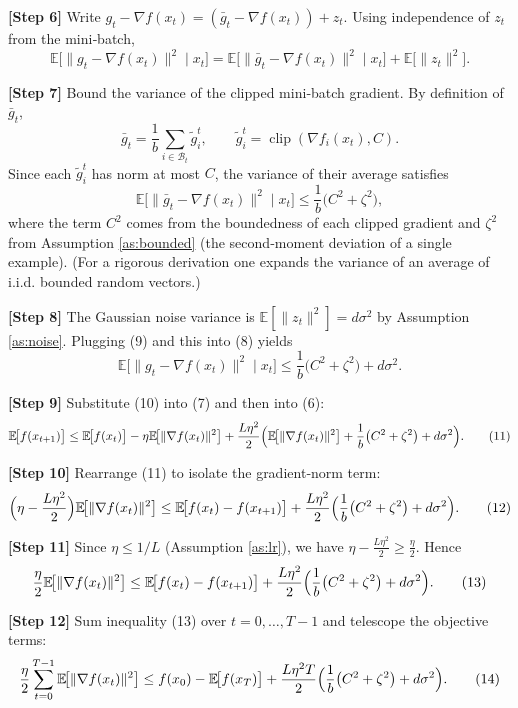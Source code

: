 \documentclass[11pt]{article}
\newcommand{\E}{\mathbb{E}}
\newcommand{\grad}{\nabla}
\begin{document}
\noindent\textbf{[Step 6]} Write $g_{t}-\grad f(x_{t})=(\bar g_{t}-\grad f(x_{t}))+z_{t}$. Using independence of $z_{t}$ from the mini‑batch,
\[
\E\!\bigl[\|g_{t}-\grad f(x_{t})\|^{2}\mid x_{t}\bigr]
= \E\!\bigl[\|\bar g_{t}-\grad f(x_{t})\|^{2}\mid x_{t}\bigr]
+ \E\!\bigl[\|z_{t}\|^{2}\bigr].
\tag{8}
\]

\noindent\textbf{[Step 7]} Bound the variance of the clipped mini‑batch gradient. By definition of $\bar g_{t}$,
\[
\bar g_{t}= \frac{1}{b}\sum_{i\in\mathcal{B}_{t}}\tilde g_{i}^{t},
\qquad
\tilde g_{i}^{t}= \operatorname{clip}(\grad f_{i}(x_{t}),C).
\]
Since each $\tilde g_{i}^{t}$ has norm at most $C$, the variance of their average satisfies
\[
\E\!\bigl[\|\bar g_{t}-\grad f(x_{t})\|^{2}\mid x_{t}\bigr]
\le \frac{1}{b}\bigl(C^{2}+\zeta^{2}\bigr),
\tag{9}
\]
where the term $C^{2}$ comes from the boundedness of each clipped gradient and $\zeta^{2}$ from Assumption \ref{as:bounded} (the second‑moment deviation of a single example).  
(For a rigorous derivation one expands the variance of an average of i.i.d. bounded random vectors.)

\noindent\textbf{[Step 8]} The Gaussian noise variance is $\E[\|z_{t}\|^{2}]=d\sigma^{2}$ by Assumption \ref{as:noise}. Plugging (9) and this into (8) yields
\[
\E\!\bigl[\|g_{t}-\grad f(x_{t})\|^{2}\mid x_{t}\bigr]
\le \frac{1}{b}\bigl(C^{2}+\zeta^{2}\bigr)+d\sigma^{2}.
\tag{10}
\]

\noindent\textbf{[Step 9]} Substitute (10) into (7) and then into (6):
\[
\E\!\bigl[f(x_{t+1})\bigr]
\le \E\!\bigl[f(x_{t})\bigr]
-\eta\E\!\bigl[\|\grad f(x_{t})\|^{2}\bigr]
+\frac{L\eta^{2}}{2}\Bigl(\E\!\bigl[\|\grad f(x_{t})\|^{2}\bigr]
+\frac{1}{b}\bigl(C^{2}+\zeta^{2}\bigr)+d\sigma^{2}\Bigr).
\tag{11}
\]

\noindent\textbf{[Step 10]} Rearrange (11) to isolate the gradient‑norm term:
\[
\Bigl(\eta-\frac{L\eta^{2}}{2}\Bigr)\E\!\bigl[\|\grad f(x_{t})\|^{2}\bigr]
\le \E\!\bigl[f(x_{t})-f(x_{t+1})\bigr]
+\frac{L\eta^{2}}{2}\Bigl(\frac{1}{b}\bigl(C^{2}+\zeta^{2}\bigr)+d\sigma^{2}\Bigr).
\tag{12}
\]

\noindent\textbf{[Step 11]} Since $\eta\le 1/L$ (Assumption \ref{as:lr}), we have $\eta-\frac{L\eta^{2}}{2}\ge \frac{\eta}{2}$. Hence
\[
\frac{\eta}{2}\E\!\bigl[\|\grad f(x_{t})\|^{2}\bigr]
\le \E\!\bigl[f(x_{t})-f(x_{t+1})\bigr]
+\frac{L\eta^{2}}{2}\Bigl(\frac{1}{b}\bigl(C^{2}+\zeta^{2}\bigr)+d\sigma^{2}\Bigr).
\tag{13}
\]

\noindent\textbf{[Step 12]} Sum inequality (13) over $t=0,\dots,T-1$ and telescope the objective terms:
\[
\frac{\eta}{2}\sum_{t=0}^{T-1}\E\!\bigl[\|\grad f(x_{t})\|^{2}\bigr]
\le f(x_{0})- \E\!\bigl[f(x_{T})\bigr]
+ \frac{L\eta^{2}T}{2}\Bigl(\frac{1}{b}\bigl(C^{2}+\zeta^{2}\bigr)+d\sigma^{2}\Bigr).
\tag{14}
\]
\end{document}
